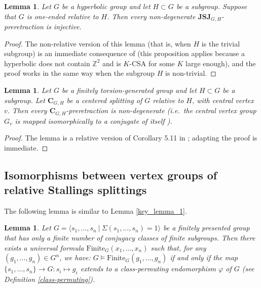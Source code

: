 \documentclass[a4paper, 11pt]{amsart}
\newtheorem{lemme}[te]{Lemma}
\theoremstyle{definition}
\theoremstyle{remark}
\begin{document}

\begin{lemme}\label{injective_relative}
Let $G$ be a hyperbolic group and let $H\subset G$ be a subgroup. Suppose that $G$ is one-ended relative to $H$. Then every non-degenerate $\mathbf{JSJ}_{G,H}$-preretraction is injective.\end{lemme}

\begin{proof}
The non-relative version of this lemma (that is, when $H$ is the trivial subgroup) is an immediate consequence of \cite[Proposition 7.1]{And18} (this proposition applies because a hyperbolic does not contain $\mathbb{Z}^2$ and is $K$-CSA for some $K$ large enough), and the proof works in the same way when the subgroup $H$ is non-trivial.
\end{proof}

\begin{lemme}\label{injective2}
Let $G$ be a finitely torsion-generated group and let $H\subset G$ be a subgroup. Let $\mathbf{C}_{G,H}$ be a centered splitting of $G$ relative to $H$, with central vertex $v$. Then every $\mathbf{C}_{G,H}$-preretraction is non-degenerate (i.e.\ the central vertex group $G_v$ is mapped isomorphically to a conjugate of itself ).\end{lemme}

\begin{proof}
The lemma is a relative version of Corollary 5.11 in \cite{AP24}; adapting the proof is immediate.
\end{proof}

\subsection{Isomorphisms between vertex groups of relative Stallings splittings}

The following lemma is similar to Lemma \ref{key_lemma_1}.

\begin{lemme}\label{non_conj_to_non_conj}
Let $G=\langle s_1,\ldots,s_n \ \vert \ \Sigma(s_1,\ldots,s_n)=1\rangle$ be a finitely presented group that has only a finite number of conjugacy classes of finite subgroups. Then there exists a universal formula $\mathrm{Finite}_G(x_1,\ldots,x_n)$ such that, for any $(g_1,\ldots,g_n)\in G^n$, we have: $G\models \mathrm{Finite}_G(g_1,\ldots,g_n)$ if and only if the map $ \lbrace s_1,\ldots,s_n \rbrace \rightarrow G : s_i\mapsto g_i$ extends to a class-permuting endomorphism $\varphi$ of $G$ (see Definition \ref{class-permuting}).\end{lemme}
\end{document}
